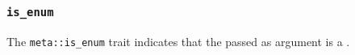 
\subsubsection{\texttt{is\_enum}}

The \texttt{meta::is\_enum}
trait indicates that the  passed as argument is a .


